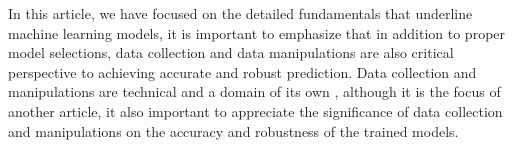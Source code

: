 
\par
In this article, we have focused on the detailed fundamentals that underline machine learning models, it is important to emphasize that in addition to proper model selections, data collection and data manipulations are also critical perspective to achieving accurate and robust prediction. Data collection and manipulations are technical and a domain of its own , although it is the focus of another article, it also important to appreciate the significance of data collection and manipulations on the accuracy and robustness of the trained models.
\par 

